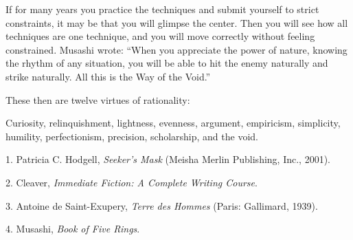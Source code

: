 {
 If for many years you practice the techniques and submit yourself
to strict constraints, it may be that you will glimpse the center. Then
you will see how all techniques are one technique, and you will move
correctly without feeling constrained. Musashi wrote:
``When you appreciate the power of nature, knowing the
rhythm of any situation, you will be able to hit the enemy naturally
and strike naturally. All this is the Way of the
Void.''}

{
 These then are twelve virtues of rationality:}

{
 Curiosity, relinquishment, lightness, evenness, argument,
empiricism, simplicity, humility, perfectionism, precision,
scholarship, and the void.}

\myendsectiontext


\bigskip

{
 1. Patricia C. Hodgell, \textit{Seeker's Mask}
(Meisha Merlin Publishing, Inc., 2001).}

{
 2. Cleaver, \textit{Immediate Fiction: A Complete Writing
Course}.}

{
 3. Antoine de Saint-Exupery, \textit{Terre des Hommes} (Paris:
Gallimard, 1939).}

{
 4. Musashi, \textit{Book of Five Rings}.}



